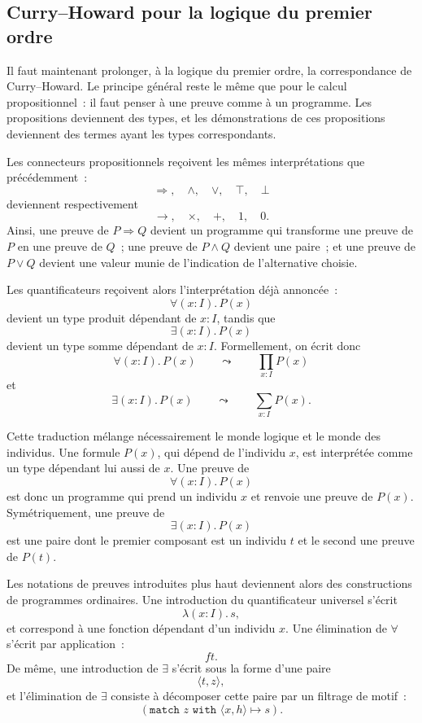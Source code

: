 \subsection{Curry--Howard pour la logique du premier ordre}

\thingy
Il faut maintenant prolonger, à la logique du premier ordre, la
correspondance de Curry--Howard.  Le principe général reste le même que
pour le calcul propositionnel : il faut penser à une preuve comme à un
programme.  Les propositions deviennent des types, et les
démonstrations de ces propositions deviennent des termes ayant les types
correspondants.


\thingy
Les connecteurs propositionnels reçoivent les mêmes interprétations que
précédemment :
\[
\Rightarrow,\quad\land,\quad\lor,\quad\top,\quad\bot
\]
deviennent respectivement
\[
\rightarrow,\quad\times,\quad+,\quad1,\quad0.
\]
Ainsi, une preuve de $P\Rightarrow Q$ devient un programme qui
transforme une preuve de $P$ en une preuve de $Q$ ; une preuve de
$P\land Q$ devient une paire ; et une preuve de $P\lor Q$ devient une
valeur munie de l'indication de l'alternative choisie.

Les quantificateurs reçoivent alors l'interprétation déjà annoncée :
\[
\forall(x:I).\,P(x)
\]
devient un type produit dépendant de $x:I$, tandis que
\[
\exists(x:I).\,P(x)
\]
devient un type somme dépendant de $x:I$.  Formellement, on écrit donc
\[
\forall(x:I).\,P(x)
\qquad\leadsto\qquad
\prod_{x:I} P(x)
\]
et
\[
\exists(x:I).\,P(x)
\qquad\leadsto\qquad
\sum_{x:I} P(x).
\]

\thingy
Cette traduction mélange nécessairement le monde logique et le monde
des individus.  Une formule $P(x)$, qui dépend de l'individu $x$, est
interprétée comme un type dépendant lui aussi de $x$.  Une preuve de
\[
\forall(x:I).\,P(x)
\]
est donc un programme qui prend un individu $x$ et renvoie une preuve de
$P(x)$.  Symétriquement, une preuve de
\[
\exists(x:I).\,P(x)
\]
est une paire dont le premier composant est un individu $t$ et le second
une preuve de $P(t)$.

\thingy
Les notations de preuves introduites plus haut deviennent alors des
constructions de programmes ordinaires.  Une introduction du
quantificateur universel s'écrit
\[
\lambda(x:I).\,s,
\]
et correspond à une fonction dépendant d'un individu $x$.  Une
élimination de $\forall$ s'écrit par application :
\[
ft.
\]
De même, une introduction de $\exists$ s'écrit sous la forme d'une
paire
\[
\langle t,z\rangle,
\]
et l'élimination de $\exists$ consiste à décomposer cette paire par un
filtrage de motif :
\[
(\texttt{match~}z\texttt{~with~}\langle x,h\rangle\mapsto s).
\]

